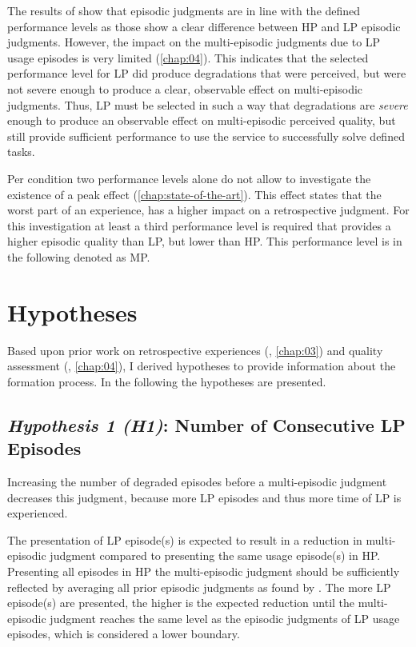 The results of \cite{moller_single-call_2011} show that episodic judgments are in line with the defined performance levels as those show a clear difference between \ac{HP} and \ac{LP} episodic judgments.
However, the impact on the multi-episodic judgments due to \ac{LP} usage episodes is very limited (\cf \autoref{chap:04}).
This indicates that the selected performance level for \ac{LP} did produce degradations that were perceived, but were not severe enough to produce a clear, observable effect on multi-episodic judgments.
Thus, \ac{LP} must be selected in such a way that degradations are \emph{severe} enough to produce an observable effect on multi-episodic perceived quality, but still provide sufficient performance to use the service to successfully solve defined tasks.

Per condition two performance levels alone do not allow to investigate the existence of a peak effect (\cf \autoref{chap:state-of-the-art}).
This effect states that the worst part of an experience, has a higher impact on a retrospective judgment.
For this investigation at least a third performance level is required that provides a higher episodic quality than \ac{LP}, but lower than \ac{HP}.
This performance level is in the following denoted as \acf{MP}.

\section{Hypotheses}
Based upon prior work on retrospective experiences (\cf, \autoref{chap:03}) and quality assessment (\cf, \autoref{chap:04}), I derived \unit[6]{hypotheses} to provide information about the formation process.
In the following the \unit[6]{hypotheses} are presented.

\subsection*{\emph{Hypothesis 1 (H1)}: Number of Consecutive \ac{LP} Episodes}
\begin{hypothesis}[H1]
Increasing the number of degraded episodes before a multi-episodic judgment decreases this judgment, because more \ac{LP} episodes and thus more time of \ac{LP} is experienced.
\end{hypothesis}

The presentation of \ac{LP} episode(s) is expected to result in a reduction in multi-episodic judgment compared to presenting the same usage episode(s) in \ac{HP}.
Presenting all episodes in \ac{HP} the multi-episodic judgment should be sufficiently reflected by averaging all prior episodic judgments as found by \cite{moller_single-call_2011}.
The more \ac{LP} episode(s) are presented, the higher is the expected reduction until the multi-episodic judgment reaches the same level as the episodic judgments of \ac{LP} usage episodes, which is considered a lower boundary.


